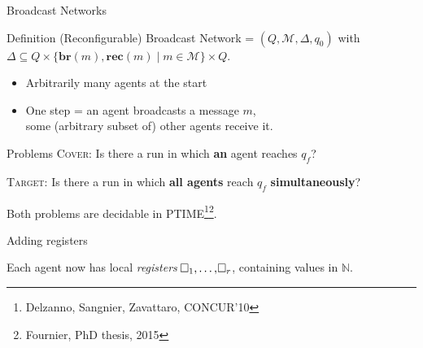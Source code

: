 \documentclass{beamer}
\newcommand{\messages}{\mathcal{M}}
\newcommand{\reg}{\hspace{-0.5mm}\square}
\newcommand{\COVER}{\textsc{Cover}}
\newcommand{\TARGET}{\textsc{Target}}
\begin{document}
\begin{frame}{Broadcast Networks}
	\begin{block}{Definition\footnotemark}
		(Reconfigurable) Broadcast Network = $(Q, \messages, \Delta, q_0)$ with $\Delta \subseteq Q\times \{\mathbf{br}(m), \mathbf{rec}(m) \mid m \in \messages\} \times Q$.
	\end{block}
	
	\pause
	
	\begin{itemize}
		\item Arbitrarily many agents at the start
		
		\item One step = an agent broadcasts a message $m$,\\ some (arbitrary subset of) other agents receive it.
	\end{itemize}
	
	\pause 
	
	\begin{block}{Problems}
		{\COVER{}}: Is there a run in which \textbf{an} agent reaches $q_f$?
		
		{\TARGET{}}: Is there a run in which \textbf{all agents} reach $q_f$ \textbf{simultaneously}?
	\end{block}
	
	Both problems are decidable in PTIME\footnote[1]{Delzanno, Sangnier, Zavattaro, CONCUR'10}\footnote<3>{Fournier, PhD thesis, 2015}.
\end{frame}

\begin{frame}{Adding registers}
	
	Each agent now has local \emph{registers} $\reg_1, \ldots, \reg_r$, containing values in $\mathbb{N}$.\vspace{0.3cm}\pause
	\begin{center}
	
	\end{center}
\end{frame}
\end{document}
